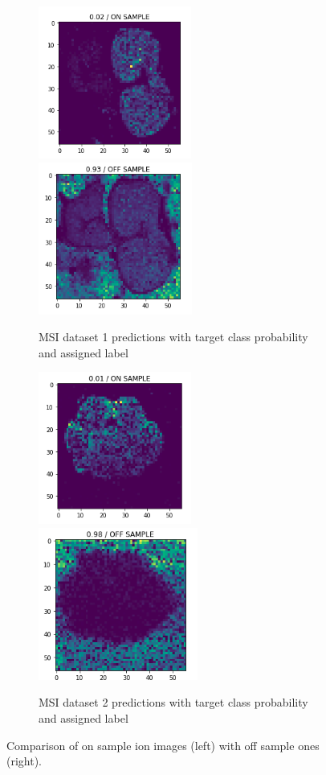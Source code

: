 \documentclass[a4paper]{article}
\begin{document}
\begin{figure}[H]
    \begin{subfigure}[b]{\textwidth}
        \centering
        \includegraphics[width=\textwidth,height=5cm,keepaspectratio]{on_sample_test_pred_1.png}
        \includegraphics[width=\textwidth,height=5cm,keepaspectratio]{off_sample_test_pred_1.png}
        \caption{MSI dataset 1 predictions with target class probability and assigned label}
    \end{subfigure}
    \begin{subfigure}[b]{\textwidth}
        \centering
        \includegraphics[width=\textwidth,height=5cm,keepaspectratio]{on_sample_test_pred_2.png}
        \includegraphics[width=\textwidth,height=5cm,keepaspectratio]{off_sample_test_pred_2.png}
        \caption{MSI dataset 2 predictions with target class probability and assigned label}
    \end{subfigure}
    \caption{Comparison of on sample ion images (left) with off sample ones (right).}
\end{figure}
\end{document}
